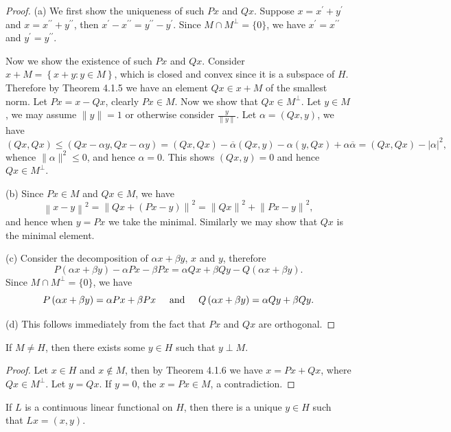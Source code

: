 \begin{proof}
(a) We first show the uniqueness of such $Px$ and $Qx$. Suppose $x=x^\prime+y^\prime$ and $x=x^{\prime\prime}+y^{\prime\prime}$, then $x^{\prime}-x^{\prime\prime}=y^{\prime\prime}-y^{\prime}$. Since $M\cap M^\perp=\{0\}$, we have $x^\prime=x^{\prime\prime}$ and $y^\prime=y^{\prime\prime}$.\par
Now we show the existence of such $Px$ and $Qx$. Consider $x+M=\left\{ x+y:y\in M \right\} $, which is closed and convex since it is a subspace of $H$. Therefore by Theorem 4.1.5 we have an element $Qx\in x+M$ of the smallest norm. Let $Px=x-Qx$, clearly $Px\in M$. Now we show that $Qx\in M^\perp$. Let $y\in M$, we may assume $\|y\|=1$ or otherwise consider $\frac{y}{\|y\|}$. Let $\alpha=(Qx,y)$, we have 
$$
\left( Qx,Qx \right) \le \left( Qx-\alpha y,Qx-\alpha y \right) =\left( Qx,Qx \right) -\overline{\alpha }\left( Qx,y \right) -\alpha \left( y,Qx \right) +\alpha \overline{\alpha }=\left( Qx,Qx \right) -\left| \alpha \right|^2,
$$
whence $\|\alpha\|^2\le 0$, and hence $\alpha=0$. This shows $(Qx,y)=0$ and hence $Qx\in M^\perp$.\par
(b) Since $Px\in M$ and $Qx\in M$, we have 
$$
\left\| x-y \right\| ^2=\left\| Qx+\left( Px-y \right) \right\| ^2=\left\| Qx \right\| ^2+\left\| Px-y \right\| ^2,
$$
and hence when $y=Px$ we take the minimal. Similarly we may show that $Qx$ is the minimal element.\par
(c) Consider the decomposition of $\alpha x+\beta y$, $x$ and $y$, therefore 
$$
P\left( \alpha x+\beta y \right) -\alpha Px-\beta Px=\alpha Qx+\beta Qy-Q\left( \alpha x+\beta y \right) .
$$
Since $M\cap M^\perp=\{0\}$, we have 
$$
P\left( \alpha x+\beta y \right) =\alpha Px+\beta Px\hspace{0.5cm}\text{and}\hspace{0.5cm}Q\left( \alpha x+\beta y \right) =\alpha Qy+\beta Qy.
$$\par
(d) This follows immediately from the fact that $Px$ and $Qx$ are orthogonal.
\end{proof}
\begin{corollary}
If $M\ne H$, then there exists some $y\in H$ such that $y\perp M$.
\end{corollary}
\begin{proof}
Let $x\in H$ and $x\notin M$, then by Theorem 4.1.6 we have $x=Px+Qx$, where $Qx\in M^\perp$. Let $y=Qx$. If $y=0$, the $x=Px\in M$, a contradiction.
\end{proof}
\begin{theorem}
If $L$ is a continuous linear functional on $H$, then there is a unique $y\in H$ such that $Lx=(x,y)$.
\end{theorem}

